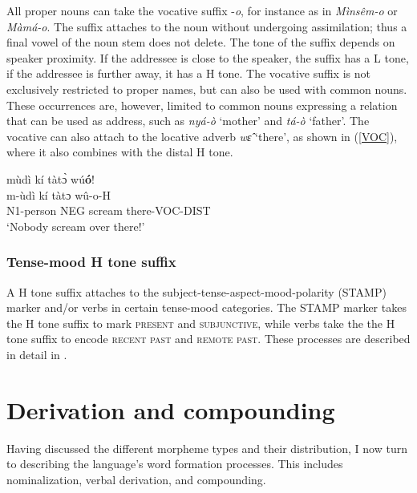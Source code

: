 All proper nouns can take the vocative suffix -{\itshape o}, for instance as in {\itshape Mìnsêm-o} or {\itshape Màmá-o}. The suffix attaches to the noun without undergoing assimilation; thus a final vowel of the noun stem does not delete. The tone of the suffix depends on speaker proximity. If the addressee is close to the speaker, the suffix has a L tone, if the addressee is further away, it has a H tone. 
The vocative suffix is not exclusively restricted to proper names, but can also be used with common nouns. These occurrences are, however,  limited to common nouns expressing a relation that can be used as address, such as {\itshape nyá-ò} `mother' and {\itshape tá-ò} `father'.  The vocative can also attach to the locative adverb {\itshape wɛ̂} `there', as shown in (\ref{VOC}), where it also combines with the distal H tone.

\begin{exe} 
\ex\label{VOC} 
  \glll mùdì kí tàtɔ̀ wú{\bfseries ó}! \\
       m-ùdì kí tàtɔ wû-o-H \\
        N1-person NEG scream there-VOC-DIST \\
    \trans `Nobody scream over there!'
\end{exe}

\subsubsection{Tense-mood H tone suffix}
\label{sec:TMHSuff}


A H tone suffix attaches to the subject-tense-aspect-mood-polarity (STAMP) marker and/or verbs in certain tense-mood categories. The STAMP marker takes the H tone suffix to mark \textsc{present} and \textsc{subjunctive}, while verbs take the the H tone suffix to encode \textsc{recent past} and \textsc{remote past}.   
These processes are described in detail in .






\section{Derivation and compounding}
\label{sec:FormProcess}


Having discussed the different morpheme types and their distribution, I now turn to describing the language's word formation processes. This includes nominalization, verbal derivation, and compounding.



